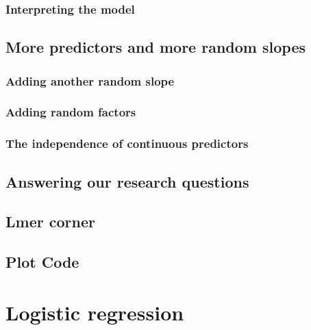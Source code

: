 \documentclass[
]{book}
\begin{document}
\hypertarget{interpreting-the-model-5}{%
\subsection{Interpreting the model}\label{interpreting-the-model-5}}

\hypertarget{more-predictors-and-more-random-slopes}{%
\section{More predictors and more random slopes}\label{more-predictors-and-more-random-slopes}}

\hypertarget{adding-another-random-slope}{%
\subsection{Adding another random slope}\label{adding-another-random-slope}}

\hypertarget{adding-random-factors}{%
\subsection{Adding random factors}\label{adding-random-factors}}

\hypertarget{the-independence-of-continuous-predictors}{%
\subsection{The independence of continuous predictors}\label{the-independence-of-continuous-predictors}}

\hypertarget{answering-our-research-questions-1}{%
\section{Answering our research questions}\label{answering-our-research-questions-1}}

\hypertarget{lmer-corner-3}{%
\section{Lmer corner}\label{lmer-corner-3}}

\hypertarget{plot-code-5}{%
\section{Plot Code}\label{plot-code-5}}

\hypertarget{logistic-regression}{%
\chapter{Logistic regression}\label{logistic-regression}}
\end{document}
